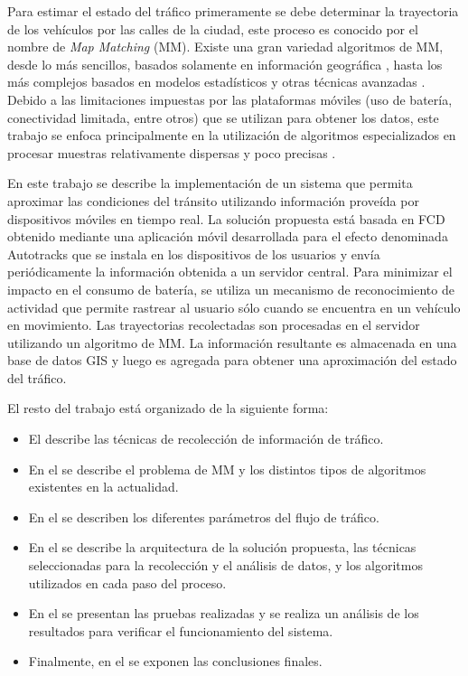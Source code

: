 Para estimar el estado del tráfico primeramente se debe determinar la trayectoria de los vehículos por las calles de la ciudad, este proceso es conocido por el nombre de \emph{Map Matching} (MM). Existe una gran variedad algoritmos de MM, desde lo más sencillos, basados solamente en información geográfica \cite{white2000some}, hasta los más complejos basados en modelos estadísticos y otras técnicas avanzadas \cite{quddus2006high,kim2001adaptive}. Debido a las limitaciones impuestas por las plataformas móviles (uso de batería, conectividad limitada, entre otros) que se utilizan para obtener los datos, este trabajo se enfoca principalmente en la utilización de algoritmos especializados en procesar muestras relativamente dispersas y poco precisas \cite{lou2009map}.

En este trabajo se describe la implementación de un sistema que permita aproximar las condiciones del tránsito utilizando información proveída por dispositivos móviles en tiempo real. La solución propuesta está basada en FCD obtenido mediante una aplicación móvil desarrollada para el efecto denominada Autotracks que se instala en los dispositivos de los usuarios y envía periódicamente la información obtenida a un servidor central. Para minimizar el impacto en el consumo de batería, se utiliza un mecanismo de reconocimiento de actividad que permite rastrear al usuario sólo cuando se encuentra en un vehículo en movimiento. Las trayectorias recolectadas son procesadas en el servidor utilizando un algoritmo de MM. La información resultante es almacenada en una base de datos GIS y luego es agregada para obtener una aproximación del estado del tráfico.

El resto del trabajo está organizado de la siguiente forma:
\begin{itemize}
\item El  describe las técnicas de recolección de información de tráfico. 
\item En el  se describe el problema de MM y los distintos tipos de algoritmos existentes en la actualidad. 
\item En el  se describen los diferentes parámetros del flujo de tráfico. 
\item En el  se describe la arquitectura de la solución propuesta, las técnicas seleccionadas para la recolección y el análisis de datos, y los algoritmos utilizados en cada paso del proceso. 
\item En el  se presentan las pruebas realizadas y se realiza un análisis de los resultados para verificar el funcionamiento del sistema. 
\item Finalmente, en el  se exponen las conclusiones finales.
\end{itemize}
